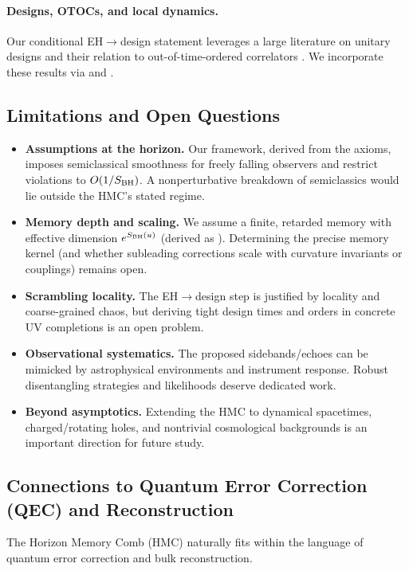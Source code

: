 \documentclass[a4paper,11pt]{article}
\newcommand{\HMC}{\textsc{HMC}\xspace}
\theoremstyle{plain}
\theoremstyle{definition}
\theoremstyle{remark}
\begin{document}
\paragraph{Designs, OTOCs, and local dynamics.}
Our conditional EH$\to$design statement leverages a large literature on unitary designs
\cite{Dankert:2009,HarrowLow:2009,BHH:2016,HunterJones:2019} and their relation to out-of-time-ordered correlators
\cite{RobertsYoshida:2017,Cotler:2017}.
We incorporate these results via  and .

\subsection{Limitations and Open Questions}
\label{sec:limitations-oq}
\begin{itemize}[leftmargin=*]
    \item \textbf{Assumptions at the horizon.} Our framework, derived from the axioms, imposes semiclassical
    smoothness for freely falling observers and restrict violations to
    \(O(1/S_{\rm BH})\). A nonperturbative breakdown of semiclassics would lie
    outside the \HMC{}'s stated regime.
    \item \textbf{Memory depth and scaling.} We assume a finite, retarded memory with
    effective dimension \(e^{S_{\rm BH}(u)}\) (derived as ). Determining the precise memory kernel
    (and whether subleading corrections scale with curvature invariants or
    couplings) remains open.
    \item \textbf{Scrambling locality.} The EH\(\rightarrow\)design step is justified by
    locality and coarse-grained chaos, but deriving tight design times and orders
    in concrete UV completions is an open problem.
    \item \textbf{Observational systematics.} The proposed sidebands/echoes can be
    mimicked by astrophysical environments and instrument response. Robust
    disentangling strategies and likelihoods deserve dedicated work.
    \item \textbf{Beyond asymptotics.} Extending the \HMC{} to dynamical spacetimes,
    charged/rotating holes, and nontrivial cosmological backgrounds is an
    important direction for future study.
\end{itemize}


\subsection{Connections to Quantum Error Correction (QEC) and Reconstruction}
\label{subsec:qec}
The Horizon Memory Comb (\HMC{}) naturally fits within the language of quantum error correction and bulk reconstruction.
\end{document}
